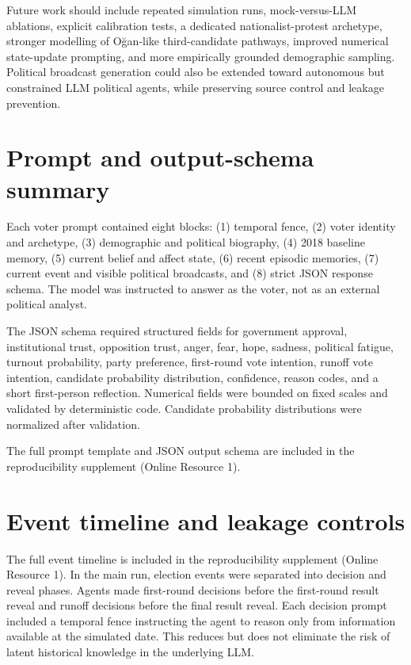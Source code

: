 \documentclass[pdflatex,sn-mathphys-num,iicol]{sn-jnl}
\begin{document}
\begin{appendices}
Future work should include repeated simulation runs, mock-versus-LLM ablations, explicit calibration tests, a dedicated nationalist-protest archetype, stronger modelling of Oğan-like third-candidate pathways, improved numerical state-update prompting, and more empirically grounded demographic sampling. Political broadcast generation could also be extended toward autonomous but constrained LLM political agents, while preserving source control and leakage prevention.

\section{Prompt and output-schema summary}\label{app:prompt_schema}

Each voter prompt contained eight blocks: (1) temporal fence, (2) voter identity and archetype, (3) demographic and political biography, (4) 2018 baseline memory, (5) current belief and affect state, (6) recent episodic memories, (7) current event and visible political broadcasts, and (8) strict JSON response schema. The model was instructed to answer as the voter, not as an external political analyst.

The JSON schema required structured fields for government approval, institutional trust, opposition trust, anger, fear, hope, sadness, political fatigue, turnout probability, party preference, first-round vote intention, runoff vote intention, candidate probability distribution, confidence, reason codes, and a short first-person reflection. Numerical fields were bounded on fixed scales and validated by deterministic code. Candidate probability distributions were normalized after validation.

The full prompt template and JSON output schema are included in the reproducibility supplement (Online Resource 1).

\section{Event timeline and leakage controls}\label{app:event_timeline}
\setcounter{table}{0}

The full event timeline is included in the reproducibility supplement (Online Resource 1). In the main run, election events were separated into decision and reveal phases. Agents made first-round decisions before the first-round result reveal and runoff decisions before the final result reveal. Each decision prompt included a temporal fence instructing the agent to reason only from information available at the simulated date. This reduces but does not eliminate the risk of latent historical knowledge in the underlying LLM.


\end{appendices}
\end{document}
